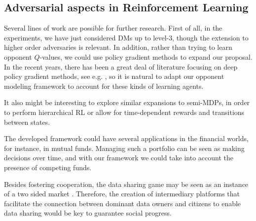\subsection{Adversarial aspects in Reinforcement Learning}

Several lines of work are possible for further research. First of all, in the experiments, we have just considered DMs up to level-3,
though the extension to higher order adversaries is relevant. %
In addition, rather than trying to learn opponent $Q$-values, we could
use policy gradient methods \parencite{baxter2000direct} to expand our proposal. In the recent years, there has been a great deal of literature focusing on deep policy gradient methods, see e.g.  \parencite{pmlr-v48-mniha16,schulman2017ppo}, so it is natural to adapt our opponent modeling framework to account for these kinds of learning agents.

It also might be interesting to explore similar expansions to semi-MDPs, 
in order to perform hierarchical RL or allow for time-dependent rewards 
and transitions between states.

The developed framework could have several applications in the financial worlds, for instance, in mutual funds. Managing such a portfolio can be seen as making decisions over time, and with our framework we could take into account the presence of competing funds.

 Besides fostering cooperation,  the data sharing game may be seen as
  an instance of a two sided market \parencite{rochet2006two}. Therefore,
  the creation of intermediary platforms that facilitate the connection between dominant data owners and citizens to enable data sharing
  would be key to guarantee social progress. 